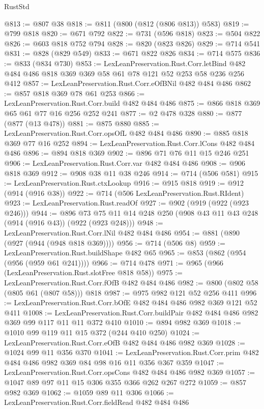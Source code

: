 \begin{lexlean}{RustStd}
\begin{coremodule}
@813 := @807 @38
@818 := @811 (@800 (@812 (@806 @813)) @583)
@819 := @799 @818
@820 := @671 @792
@822 := @731 (@596 @818)
@823 := @504 @822
@826 := @603 @818 @752 @794
@828 := @820 (@823 @826)
@829 := @714 @541
@831 := @828 (@829 @549)
@833 := @671 @822 @826
@834 := @714 @575
@836 := @833 (@834 @730)
@853 := LexLeanPreservation.Rust.Corr.letBind
    @482
    @484
    @486
    @818
    @369
    @369
    @58
    @61
    @78
    @121
    @52
    @253
    @58
    @236
    @256
    @412
@857 := LexLeanPreservation.Rust.Corr.eOfBNil @482 @484 @486
@862 := @857 @818 @369 @78 @61 @253
@866 := LexLeanPreservation.Rust.Corr.build @482 @484 @486
@875 := @866 @818 @369 @65 @61 @77 @16 @256 @252 @241
@877 := @2 @478 @328
@880 := @877 (@877 (@13 @478))
@881 := @875 @880
@885 := LexLeanPreservation.Rust.Corr.opsOfL @482 @484 @486
@890 := @885 @818 @369 @77 @16 @252
@894 := LexLeanPreservation.Rust.Corr.lCons @482 @484 @486
@896 := @894 @818 @369
@902 := @896 @71 @76 @11 @15 @246 @251
@906 := LexLeanPreservation.Rust.Corr.var @482 @484 @486
@908 := @906 @818 @369
@912 := @908 @38 @11 @38 @246
@914 := @714 (@506 @581)
@915 := LexLeanPreservation.Rust.ctxLookup
@916 := @915 @818
@919 := @912 (@914 (@916 @38))
@922 := @714 (@506 LexLeanPreservation.Rust.RIdent)
@923 := LexLeanPreservation.Rust.readOf
@927 := @902 (@919 (@922 (@923 @246)))
@944 := @896 @73 @75 @11 @14 @248 @250 (@908 @43 @11 @43 @248 (@914 (@916 @43)) (@922 (@923 @248)))
@948 := LexLeanPreservation.Rust.Corr.lNil @482 @484 @486
@954 := @881 (@890 (@927 (@944 (@948 @818 @369))))
@956 := @714 (@506 @8)
@959 := LexLeanPreservation.Rust.buildShape @482 @65
@965 := @853 (@862 (@954 (@956 (@959 @61 @241))))
@966 := @714 @478
@971 := @965 (@966 (LexLeanPreservation.Rust.slotFree @818 @58))
@975 := LexLeanPreservation.Rust.Corr.fOfB @482 @484 @486
@982 := @800 (@802 @58 (@805 @61 (@807 @58))) @818
@987 := @975 @982 @121 @52 @256 @411
@996 := LexLeanPreservation.Rust.Corr.bOfE @482 @484 @486 @982 @369 @121 @52 @411
@1008 := LexLeanPreservation.Rust.Corr.buildPair @482 @484 @486 @982 @369 @99 @117 @11 @11 @372 @410
@1010 := @894 @982 @369
@1018 := @1010 @99 @119 @11 @15 @372 (@244 @410 @250)
@1024 := LexLeanPreservation.Rust.Corr.eOfB @482 @484 @486 @982 @369
@1028 := @1024 @99 @11 @356 @370
@1041 := LexLeanPreservation.Rust.Corr.prim @482 @484 @486 @982 @369 @84 @98 @16 @11 @356 @367 @359
@1047 := LexLeanPreservation.Rust.Corr.opsCons @482 @484 @486 @982 @369
@1057 := @1047 @89 @97 @11 @15 @306 @355 @366 @262 @267 @272
@1059 := @857 @982 @369
@1062 := @1059 @89 @11 @306
@1066 := LexLeanPreservation.Rust.Corr.fieldRead @482 @484 @486

\end{coremodule}
\end{lexlean}
